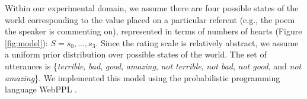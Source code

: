\documentclass[9pt,twocolumn,twoside,lineno]{main_class_file}
\begin{document}
Within our experimental domain, we assume there are four possible states
of the world corresponding to the value placed on a particular referent
(e.g., the poem the speaker is commenting on), represented in terms of numbers of hearts (Figure \ref{fig:model}):
\(S = {s_0,...,s_3}\). Since the rating scale is relatively abstract, we assume a uniform prior distribution
over possible states of the world. The set of utterances is
\{\emph{terrible}, \emph{bad}, \emph{good}, \emph{amazing}, \emph{not
terrible}, \emph{not bad}, \emph{not good}, and \emph{not amazing}\}. We
implemented this model using the probabilistic programming language
WebPPL \cite{dippl}.



\end{document}
